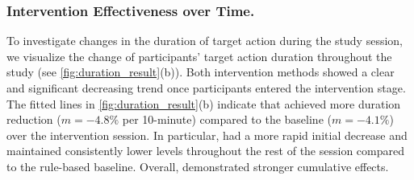 

\subsubsection{Intervention Effectiveness over Time.}
To investigate changes in the duration of target action during the study session, we visualize the change of participants' target action duration throughout the study (see \autoref{fig:duration_result}(b)).
Both intervention methods showed a clear and significant decreasing trend once participants entered the intervention stage.
The fitted lines in \autoref{fig:duration_result}(b) indicate that \projectname achieved more duration reduction ($m=-4.8\%$ per 10-minute) compared to the baseline ($m=-4.1\%$) over the intervention session.
In particular, \projectname had a more rapid initial decrease and maintained consistently lower levels throughout the rest of the session compared to the rule-based baseline.
Overall, \projectname demonstrated stronger cumulative effects.

